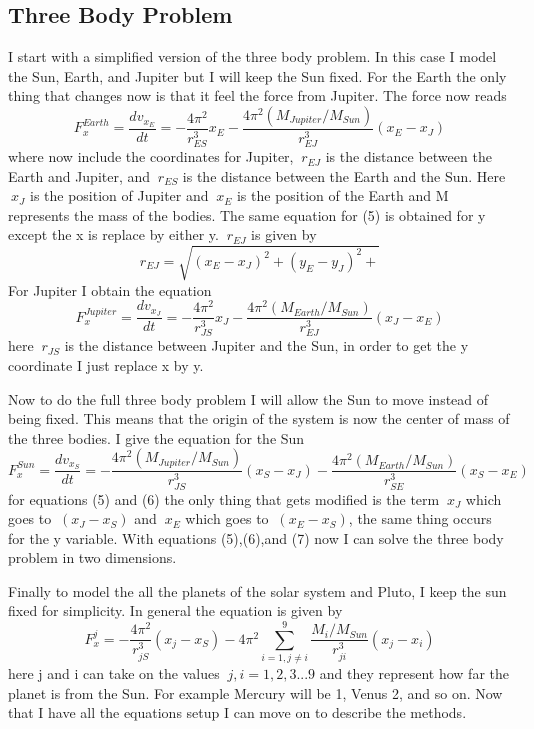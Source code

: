 \documentclass[11pt,a4wide]{article}
\begin{document}
\subsection{Three Body Problem}
I start with a simplified version of the three body problem. In this case I model the Sun, Earth, and Jupiter but I will keep the Sun fixed. For the Earth the only thing that changes now is that it feel the force from Jupiter. The force now reads
\begin{equation}
	F_x^{Earth}= \frac{dv_{x_E}}{dt} =-\frac{4\pi^2}{r_{ES}^3}x_E - \frac{4\pi^2(M_{Jupiter}/M_{Sun})}{r_{EJ}^3}(x_E -x_J)
\end{equation}
where now include the coordinates for Jupiter, $\ r_{EJ}$ is the distance between the Earth and Jupiter, and $\ r_{ES}$ is the distance between the Earth and the Sun. Here $\ x_J$ is the position of Jupiter and $\ x_E$ is the position of the Earth and M represents the mass of the bodies. The same equation for (5) is obtained for y  except the x is replace by either y. $\ r_{EJ}$ is given by 
\[
	r_{EJ}=\sqrt{(x_E -x_J)^2+(y_E -y_J)^2+}
\]
For Jupiter I obtain the equation 
\begin{equation}
	F_x^{Jupiter}= \frac{dv_{x_J}}{dt} =-\frac{4\pi^2}{r_{JS}^3}x_J - \frac{4\pi^2(M_{Earth}/M_{Sun})}{r_{EJ}^3}(x_J -x_E)
\end{equation}
here $\ r_{JS}$ is the distance between Jupiter and the Sun, in order to get the y coordinate I just replace x by y.  

Now to do the full three body problem I will allow the Sun to move instead of being fixed. This means that the origin of the system is now the center of mass of the three bodies. I give the equation for the Sun 
\begin{equation}
	F_x^{Sun}= \frac{dv_{x_S}}{dt} =-\frac{4\pi^2(M_{Jupiter}/M_{Sun})}{r_{JS}^3}(x_S- x_J) - \frac{4\pi^2(M_{Earth}/M_{Sun})}{r_{SE}^3}(x_S -x_E)
\end{equation}
for equations (5) and (6) the only thing that gets modified is the term $\ x_J$ which goes to $\ (x_J -x_S)$ and $\ x_E$ which goes to $\ (x_E -x_S)$, the same thing occurs for the y variable. With equations (5),(6),and (7) now I can solve the three body problem in two dimensions. 
	
Finally to model the all the planets of the solar system and Pluto, I keep the sun fixed for simplicity. In general the equation is given by 
\begin{equation}
	F_x^j = -\frac{4\pi^2}{r_{jS}^3}(x_j-x_S) -4\pi^2\sum_{ i=1,j\neq i}^9{\frac{M_i/M_{Sun}}{r_{ji}^3}(x_j-x_i)}
\end{equation} 
here j and i can take on the values $\ j,i =1,2,3...9$ and they represent how far the planet is from the Sun. For example Mercury will be 1, Venus 2, and so on. Now that I have all the equations setup I can move on to describe the methods. 
\end{document}
